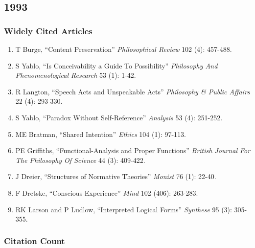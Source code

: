 \documentclass[
  10pt,
  letterpaper,
  DIV=11,
  numbers=noendperiod,
  twoside]{scrartcl}
\providecommand{\tightlist}{%
  \setlength{\itemsep}{0pt}\setlength{\parskip}{0pt}}\usepackage{longtable,booktabs,array}
\begin{document}
\newpage

\subsection{1993}\label{section-17}

\subsubsection*{Widely Cited Articles}\label{widely-cited-articles-17}

\begin{enumerate}
\def\labelenumi{\arabic{enumi}.}
\tightlist
\item
  T Burge, ``Content Preservation'' \emph{Philosophical Review} 102 (4):
  457-488.
\item
  S Yablo, ``Is Conceivability a Guide To Possibility'' \emph{Philosophy
  And Phenomenological Research} 53 (1): 1-42.
\item
  R Langton, ``Speech Acts and Unspeakable Acts'' \emph{Philosophy \&
  Public Affairs} 22 (4): 293-330.
\item
  S Yablo, ``Paradox Without Self-Reference'' \emph{Analysis} 53 (4):
  251-252.
\item
  ME Bratman, ``Shared Intention'' \emph{Ethics} 104 (1): 97-113.
\item
  PE Griffiths, ``Functional-Analysis and Proper Functions''
  \emph{British Journal For The Philosophy Of Science} 44 (3): 409-422.
\item
  J Dreier, ``Structures of Normative Theories'' \emph{Monist} 76 (1):
  22-40.
\item
  F Dretske, ``Conscious Experience'' \emph{Mind} 102 (406): 263-283.
\item
  RK Larson and P Ludlow, ``Interpreted Logical Forms'' \emph{Synthese}
  95 (3): 305-355.
\end{enumerate}

\subsubsection*{Citation Count}\label{citation-count-17}
\end{document}
